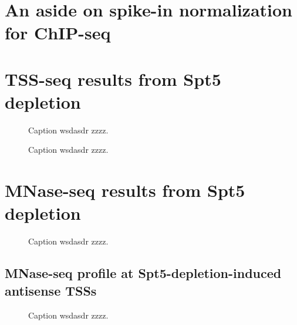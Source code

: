 \section{An aside on spike-in normalization for ChIP-seq}

\section{TSS-seq results from Spt5 depletion}

\begin{figure}
\caption[Bar plot of the number of TSS-seq peaks of various genomic classes differentially expressed in Spt5 depleted versus non-depleted cells.]{Caption wsdasdr zzzz.}
\end{figure}

\begin{figure}
\caption[Heatmaps of antisense TSS-seq, RNA-seq, and NET-seq signal from Spt5 depleted and non-depleted cells, over genes with Spt5-depletion-induced antisense TSSs.]{Caption wsdasdr zzzz.}
\end{figure}

\section{MNase-seq results from Spt5 depletion}

\begin{figure}
\caption[Average MNase-seq dyad signal from Spt5 depleted and non-depleted cells, over non-overlapping coding genes.]{Caption wsdasdr zzzz.}
\end{figure}

\subsection{MNase-seq profile at Spt5-depletion-induced antisense TSSs}

\begin{figure}
\caption[A figure showing MNase-seq signal around Spt5-depletion-induced antisense TSSs.]{Caption wsdasdr zzzz.}
\end{figure}

